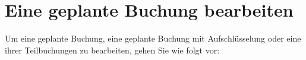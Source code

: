 \section{Eine geplante Buchung bearbeiten\label{plannedtransactions-modify}}

Um eine geplante Buchung, eine geplante Buchung mit Aufschlüsselung oder eine ihrer Teilbuchungen zu bearbeiten, gehen Sie wie folgt vor:

